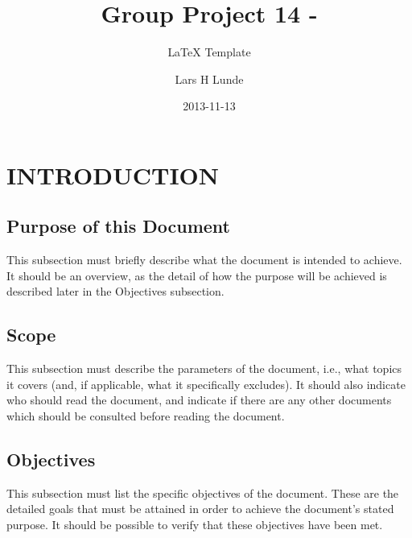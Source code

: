 \documentclass{project}
\begin{document}
\title{Group Project 14 -}

\subtitle{LaTeX Template}
\author{Lars H Lunde}     
\date{2013-11-13}

\maketitle
\tableofcontents
\newpage


\section{INTRODUCTION}

\subsection{Purpose of this Document}
This subsection must briefly describe what the document is
intended to achieve. It should be an overview, as the detail of how
the purpose will be achieved is described later in the Objectives subsection. \cite{se.qa.03}

\subsection{Scope}
This subsection must describe the parameters of the document, i.e., what topics it
covers (and, if applicable, what it specifically excludes). It should also indicate who should
read the document, and indicate if there are any other documents which should be consulted
before reading the document. \cite{se.qa.03}

\subsection{Objectives}
This subsection must list the specific objectives of the document. These are the
detailed goals that must be attained in order to achieve the document's stated purpose. It
should be possible to verify that these objectives have been met. \cite{se.qa.03}



\end{document}
